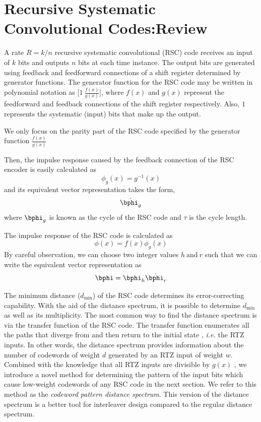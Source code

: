 \section{Recursive Systematic Convolutional Codes:Review}
\label{sec3}
A rate $R=k/n$ recursive systematic convolutional (RSC) code receives an input of $k$ bits and outputs $n$ bits at each time instance. The output bits are generated using feedback and feedforward connections of a shift register determined by generator functions. The generator function for the RSC code may be written in polynomial notation as $\Big[1 ~\frac{f(x)}{g(x)}\Big]$, where $f(x)$ and $g(x)$ represent the feedforward and feedback connections of the shift register respectively. Also, $1$ represents the systematic (input) bits  that make up the output.

We only focus on the parity part of the RSC code specified by the generator function $\frac{f(x)}{g(x)}$


Then, the impulse response caused by the feedback connection of the RSC encoder is easily calculated as 
$$\phi_g(x)=g^{-1}(x)$$
and its equivalent vector representation takes the form, 
$$\dot{\bphi_g}$$
where $\bphi_g$ is known as the cycle of the RSC code and $\tau$ is the cycle length. 

The impulse response of the RSC code is calculated as $$\phi(x)=f(x)\phi_{g}(x)$$ 
By careful observation, we can choose two integer values $h ~ \text{and}~ r$ such that we can write the equivalent vector representation as $$\bphi=\bphi_h\dot{\bphi_r}$$

The minimum distance ($d_{\text{min}}$) of the RSC code determines its error-correcting capability. With the aid of the distance spectrum, it is possible to determine $d_{\text{min}}$ as well as its multiplicity. The most common way to find the distance spectrum is via the transfer function of the RSC code. The transfer function enumerates all the paths that diverge from and then return to the initial state \cite{ref3}, \textit{i.e.} the RTZ inputs. In other words, the distance spectrum provides information about the number of codewords of weight $d$ generated by an RTZ input of weight $w$. Combined with the knowledge that all RTZ inputs are divisible by $g(x)$ \cite{ref6}, we introduce a novel method for determining the pattern of the input bits which cause low-weight codewords of any RSC code in the next section. We refer to this method as the  \textit{codeword pattern distance spectrum}. This version of the distance spectrum is a better tool for interleaver design compared to the regular distance spectrum.

